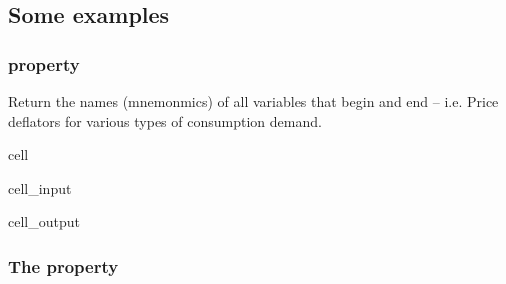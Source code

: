 \documentclass[letterpaper,10pt,english]{jupyterBook}
\begin{document}
\subsection{Some examples}
\label{\detokenize{content/05_WBModels/LoadingWBModel:some-examples}}

\subsubsection{ property}
\label{\detokenize{content/05_WBModels/LoadingWBModel:names-property}}
\sphinxAtStartPar
{}

\sphinxAtStartPar
Return the names (mnemonmics) of all variables that begin  and end  – i.e. Price deflators for various types of consumption demand.

\begin{sphinxuseclass}{cell}\begin{sphinxVerbatimInput}

\begin{sphinxuseclass}{cell_input}
\begin{sphinxVerbatim}[commandchars=\\\{\}]
\PYG{p}{[}\PYG{p}{]}
\end{sphinxVerbatim}

\end{sphinxuseclass}\end{sphinxVerbatimInput}
\begin{sphinxVerbatimOutput}

\begin{sphinxuseclass}{cell_output}
\begin{sphinxVerbatim}
\end{sphinxVerbatim}

\end{sphinxuseclass}\end{sphinxVerbatimOutput}

\end{sphinxuseclass}

\subsubsection{The  property}
\label{\detokenize{content/05_WBModels/LoadingWBModel:the-des-property}}
\sphinxAtStartPar
{}
\end{document}
